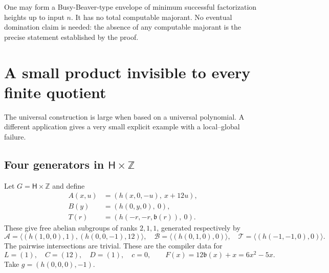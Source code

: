 \documentclass[11pt,letterpaper]{article}
\theoremstyle{definition}
\theoremstyle{remark}
\newcommand{\ZZ}{\mathbb Z}
\newcommand{\HH}{\mathsf H}
\newcommand{\calA}{\mathcal A}
\newcommand{\calB}{\mathcal B}
\newcommand{\calT}{\mathcal T}
\newcommand{\bn}{\mathfrak b}
\begin{document}
One may form a Busy-Beaver-type envelope of minimum successful factorization
heights up to input $n$. It has no total computable majorant. No eventual
domination claim is needed: the absence of any computable majorant is the
precise statement established by the proof.

\section{A small product invisible to every finite quotient}
\label{gts:tp:sec:profinite}

The universal construction is large when based on a universal polynomial.
A different application gives a very small explicit example with a
local--global failure.

\subsection{Four generators in \texorpdfstring{$\HH\times\ZZ$}{H x Z}}
Let $G=\HH\times\ZZ$ and define
\begin{align}
 A(x,u)&=(h(x,0,-u),\ x+12u),\label{gts:tp:eq:localA}\\
 B(y)&=(h(0,y,0),\ 0),\label{gts:tp:eq:localB}\\
 T(r)&=(h(-r,-r,\bn(r)),\ 0).\label{gts:tp:eq:localT}
\end{align}
These give free abelian subgroups of ranks $2,1,1$, generated respectively
by
\[
 \calA=\langle (h(1,0,0),1),(h(0,0,-1),12)\rangle,\quad
 \calB=\langle(h(0,1,0),0)\rangle,\quad
 \calT=\langle(h(-1,-1,0),0)\rangle.
\]
The pairwise intersections are trivial. These are the compiler data for
\[
        L=(1),\quad C=(12),\quad D=(1),\quad c=0,
        \qquad F(x)=12\bn(x)+x=6x^2-5x.
\]
Take $g=(h(0,0,0),-1)$.
\end{document}
